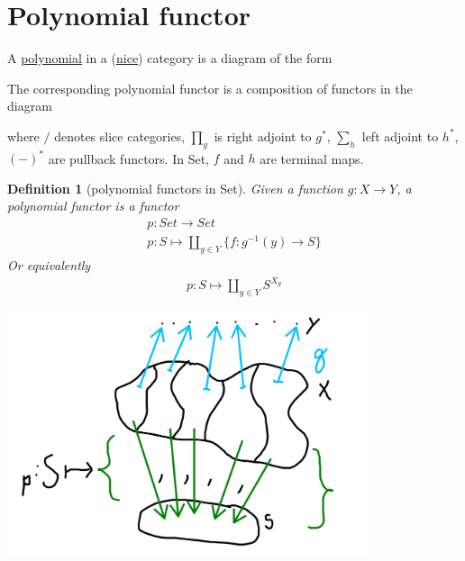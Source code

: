 \documentclass{article}
\newtheorem{definition}{Definition}[section]
\begin{document}
    \section{Polynomial functor}
    A \href{https://ncatlab.org/nlab/show/polynomial+functor}{polynomial} in a (\href{https://ncatlab.org/nlab/show/locally+cartesian+closed+category}{nice}) category is a diagram of the form
    \begin{center}
    \end{center}
    The corresponding polynomial functor is a composition of functors in the diagram
    \begin{center}
    \end{center}
    where \(/\) denotes slice categories, \(\prod_g\) is right adjoint to \(g^*\), \(\sum_h\) left adjoint to \(h^*\), \((-)^*\) are pullback functors. In Set, \(f\) and \(h\) are terminal maps.

    \begin{definition}[polynomial functors in Set]
        Given a function \(g:X\to Y\), a polynomial functor is a functor
        \begin{align*}
            p:Set\to Set\\
            p:S\mapsto \coprod_{y\in Y} \{f:g^{-1}(y)\to S\}
        \end{align*}
        Or equivalently
        \begin{align*}
            p:S\mapsto \coprod_{y\in Y}S^{X_y}
        \end{align*}
    \end{definition}
    \includegraphics[width=0.8\textwidth]{polyf}
\end{document}
